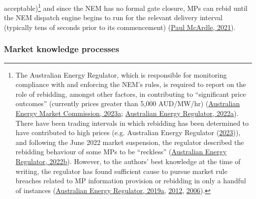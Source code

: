\documentclass[12pt,a4paper,]{report}
\begin{document}
acceptable)\footnote{The Australian Energy Regulator, which is
  responsible for monitoring compliance with and enforcing the NEM's
  rules, is required to report on the role of rebidding, amongst other
  factors, in contributing to ``significant price outcomes'' (currently
  prices greater than 5,000 AUD/MW/hr)
  (\protect\hyperlink{ref-australianenergymarketcommissionNationalElectricityRules2023a}{Australian
  Energy Market Commission, 2023a};
  \protect\hyperlink{ref-australianenergyregulatorSignificantPriceReporting2022}{Australian
  Energy Regulator, 2022a}). There have been trading intervals in which
  rebidding has been determined to have contributed to high prices (e.g.
  Australian Energy Regulator
  (\protect\hyperlink{ref-australianenergyregulatorElectricityPrices0002023}{2023})),
  and following the June 2022 market suspension, the regulator described
  the rebidding behaviour of some MPs to be ``reckless''
  (\protect\hyperlink{ref-australianenergyregulatorJune2022Market2022}{Australian
  Energy Regulator, 2022b}). However, to the authors' best knowledge at
  the time of writing, the regulator has found sufficient cause to
  pursue market rule breaches related to MP information provision or
  rebidding in only a handful of instances
  (\protect\hyperlink{ref-australianenergyregulatorPelicanPointPower2019}{Australian
  Energy Regulator, 2019a},
  \protect\hyperlink{ref-australianenergyregulatorQueenslandGeneratorStanwell2012}{2012},
  \protect\hyperlink{ref-australianenergyregulatorInfringementNoticeAGL2006}{2006}).}
and since the NEM has no formal gate closure, MPs can rebid until the
NEM dispatch engine begins to run for the relevant delivery interval
(typically tens of seconds prior to its commencement)
(\protect\hyperlink{ref-paulmcardleTwoRecentImprovements2021}{Paul
McArdle, 2021}).

\hypertarget{sec:info-context-nem-knowledge_processes}{%
\subsubsection{Market knowledge
processes}\label{sec:info-context-nem-knowledge_processes}}
\end{document}
